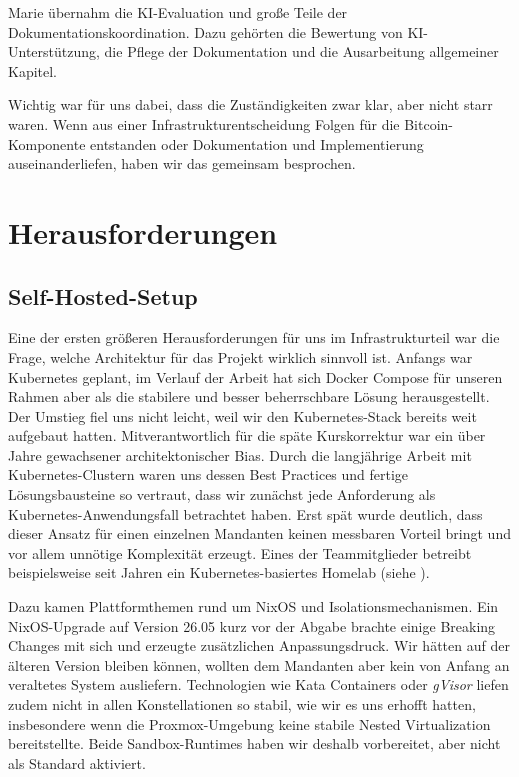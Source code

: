 Marie übernahm die KI-Evaluation und große Teile der Dokumentationskoordination. Dazu gehörten die Bewertung von KI-Unterstützung, die Pflege der Dokumentation und die Ausarbeitung allgemeiner Kapitel.

Wichtig war für uns dabei, dass die Zuständigkeiten zwar klar, aber nicht starr waren. Wenn aus einer Infrastrukturentscheidung Folgen für die Bitcoin-Komponente entstanden oder Dokumentation und Implementierung auseinanderliefen, haben wir das gemeinsam besprochen. 


\section{Herausforderungen}
\subsection{Self-Hosted-Setup}
\label{sec:herausforderungen-selfhosted}
Eine der ersten größeren Herausforderungen für uns im Infrastrukturteil war die Frage, welche Architektur für das Projekt wirklich sinnvoll ist. Anfangs war Kubernetes geplant, im Verlauf der Arbeit hat sich Docker Compose für unseren Rahmen aber als die stabilere und besser beherrschbare Lösung herausgestellt. Der Umstieg fiel uns nicht leicht, weil wir den Kubernetes-Stack bereits weit aufgebaut hatten. Mitverantwortlich für die späte Kurskorrektur war ein über Jahre gewachsener architektonischer Bias. Durch die langjährige Arbeit mit Kubernetes-Clustern waren uns dessen Best Practices und fertige Lösungsbausteine so vertraut, dass wir zunächst jede Anforderung als Kubernetes-Anwendungsfall betrachtet haben. Erst spät wurde deutlich, dass dieser Ansatz für einen einzelnen Mandanten keinen messbaren Vorteil bringt und vor allem unnötige Komplexität erzeugt. Eines der Teammitglieder betreibt beispielsweise seit Jahren ein Kubernetes-basiertes Homelab (siehe ).

Dazu kamen Plattformthemen rund um NixOS und Isolationsmechanismen. Ein NixOS-Upgrade auf Version 26.05 kurz vor der Abgabe brachte einige Breaking Changes mit sich und erzeugte zusätzlichen Anpassungsdruck. Wir hätten auf der älteren Version bleiben können, wollten dem Mandanten aber kein von Anfang an veraltetes System ausliefern. Technologien wie Kata Containers oder \textit{gVisor} liefen zudem nicht in allen Konstellationen so stabil, wie wir es uns erhofft hatten, insbesondere wenn die Proxmox-Umgebung keine stabile Nested Virtualization bereitstellte. Beide Sandbox-Runtimes haben wir deshalb vorbereitet, aber nicht als Standard aktiviert.

